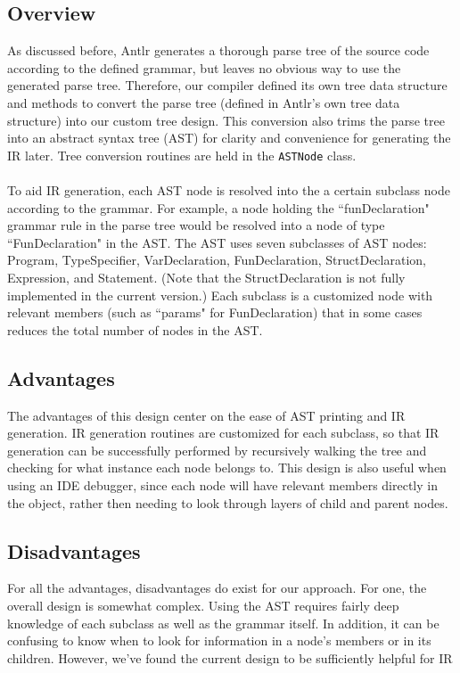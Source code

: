 \documentclass{scrartcl}
\begin{document}
\subsection{Overview}
As discussed before, Antlr generates a thorough parse tree of the source code according to the defined grammar, but leaves no obvious way to use the generated parse tree. Therefore, our compiler defined its own tree data structure and methods to convert the parse tree (defined in Antlr's own tree data structure) into our custom tree design. This conversion also trims the parse tree into an abstract syntax tree (AST) for clarity and convenience for generating the IR later. Tree conversion routines are held in the \verb|ASTNode| class.\\
\\
To aid IR generation, each AST node is resolved into the a certain subclass node according to the grammar. For example, a node holding the ``funDeclaration" grammar rule in the parse tree would be resolved into a node of type ``FunDeclaration" in the AST. The AST uses seven subclasses of AST nodes: Program, TypeSpecifier, VarDeclaration, FunDeclaration, StructDeclaration, Expression, and Statement. (Note that the StructDeclaration is not fully implemented in the current version.) Each subclass is a customized node with relevant members (such as ``params" for FunDeclaration) that in some cases reduces the total number of nodes in the AST.\\
\subsection{Advantages}
The advantages of this design center on the ease of AST printing and IR generation. IR generation routines are customized for each subclass, so that IR generation can be successfully performed by recursively walking the tree and checking for what instance each node belongs to. This design is also useful when using an IDE debugger, since each node will have relevant members directly in the object, rather then needing to look through layers of child and parent nodes.\\
\subsection{Disadvantages}
For all the advantages, disadvantages do exist for our approach. For one, the overall design is somewhat complex. Using the AST requires fairly deep knowledge of each subclass as well as the grammar itself. In addition, it can be confusing to know when to look for information in a node's members or in its children. However, we've found the current design to be sufficiently helpful for IR
\end{document}
